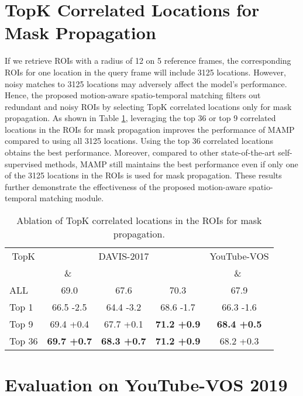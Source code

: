 \documentclass[letterpaper]{article} \usepackage{aaai22}  \usepackage{times}  \usepackage{helvet}  \usepackage{courier}  \usepackage[hyphens]{url}  \usepackage{graphicx} \urlstyle{rm} \def\UrlFont{\rm}  \usepackage{natbib}  \usepackage{caption} \DeclareCaptionStyle{ruled}{labelfont=normalfont,labelsep=colon,strut=off} \frenchspacing  \setlength{\pdfpagewidth}{8.5in}  \setlength{\pdfpageheight}{11in}  \usepackage{algorithm}
\begin{document}
\section{TopK Correlated Locations for Mask Propagation}
\vspace{2mm}

If we retrieve ROIs with a radius of 12 on 5 reference frames, the corresponding ROIs for one location in the query frame will include 3125 locations. However, noisy matches to 3125 locations may adversely affect the model's performance. Hence, the proposed motion-aware spatio-temporal matching filters out redundant and noisy ROIs by selecting TopK correlated locations only for mask propagation. As shown in Table \ref{abtopk}, leveraging the top 36 or top 9 correlated locations in the ROIs for mask propagation improves the performance of MAMP compared to using all 3125 locations. Using the top 36 correlated locations obtains the best performance. Moreover, compared to other {state-of-the-art self-supervised} methods, MAMP still maintains the best performance even if only one of the 3125 locations in the ROIs is used for mask propagation. These results further demonstrate the effectiveness of the proposed motion-aware spatio-temporal matching module.

\begin{table}[h]
\small
\centering
\begin{tabular}{lcccc}
\toprule[1.5pt]
\multicolumn{1}{c}{TopK} & \multicolumn{3}{c}{DAVIS-2017} & \multicolumn{1}{c}{YouTube-VOS}\\
\cmidrule(lr){2-4}\cmidrule(lr){5-5} & \ \& \ & \ & \ & \ \& \ \\
\hline
ALL  & 69.0 & 67.6 & 70.3 & 67.9 \\
\hline
Top 1  & 66.5 -2.5 & 64.4 -3.2 & 68.6 -1.7 & 66.3 -1.6 \\
Top 9  & 69.4 +0.4 & 67.7 +0.1 & \textbf{71.2 +0.9} & \textbf{68.4 +0.5} \\
Top 36  & \textbf{69.7 +0.7} & \textbf{68.3 +0.7} & \textbf{71.2 +0.9} & 68.2 +0.3 \\
\toprule[1.5pt]
\end{tabular}
\caption{Ablation of TopK correlated locations in the ROIs for mask propagation.} \label{abtopk}
\end{table}

\section{Evaluation on YouTube-VOS 2019}
\vspace{2mm}
\end{document}
